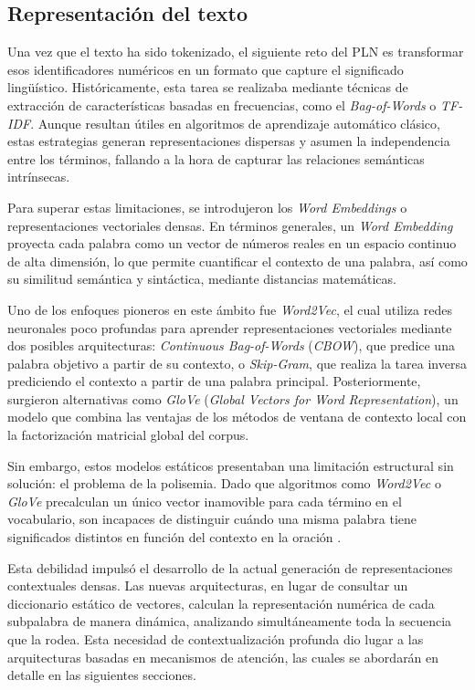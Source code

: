 \subsection{Representación del texto}
\label{subsec:Embeddings}
Una vez que el texto ha sido tokenizado, el siguiente reto del PLN es transformar esos identificadores numéricos en un formato que capture el significado lingüístico. Históricamente, esta tarea se realizaba mediante técnicas de extracción de características basadas en frecuencias, como el \textit{Bag-of-Words} o \textit{TF-IDF}. Aunque resultan útiles en algoritmos de aprendizaje automático clásico, estas estrategias generan representaciones dispersas y asumen la independencia entre los términos, fallando a la hora de capturar las relaciones semánticas intrínsecas. 

Para superar estas limitaciones, se introdujeron los \textit{Word Embeddings} o representaciones vectoriales densas. En términos generales, un \textit{Word Embedding} proyecta cada palabra como un vector de números reales en un espacio continuo de alta dimensión, lo que permite cuantificar el contexto de una palabra, así como su similitud semántica y sintáctica, mediante distancias matemáticas.

Uno de los enfoques pioneros en este ámbito fue \textit{Word2Vec}, el cual utiliza redes neuronales poco profundas para aprender representaciones vectoriales mediante dos posibles arquitecturas: \textit{Continuous Bag-of-Words} (\textit{CBOW}), que predice una palabra objetivo a partir de su contexto, o \textit{Skip-Gram}, que realiza la tarea inversa prediciendo el contexto a partir de una palabra principal. Posteriormente, surgieron alternativas como \textit{GloVe} (\textit{Global Vectors for Word Representation}), un modelo que combina las ventajas de los métodos de ventana de contexto local con la factorización matricial global del corpus.  

Sin embargo, estos modelos estáticos presentaban una limitación estructural sin solución: el problema de la polisemia. Dado que algoritmos como \textit{Word2Vec} o \textit{GloVe} precalculan un único vector inamovible para cada término en el vocabulario, son incapaces de distinguir cuándo una misma palabra tiene significados distintos en función del contexto en la oración \cite{jurafsky2014speech}.

Esta debilidad impulsó el desarrollo de la actual generación de representaciones contextuales densas. Las nuevas arquitecturas, en lugar de consultar un diccionario estático de vectores, calculan la representación numérica de cada subpalabra de manera dinámica, analizando simultáneamente toda la secuencia que la rodea. Esta necesidad de contextualización profunda dio lugar a las arquitecturas basadas en mecanismos de atención, las cuales se abordarán en detalle en las siguientes secciones. 

